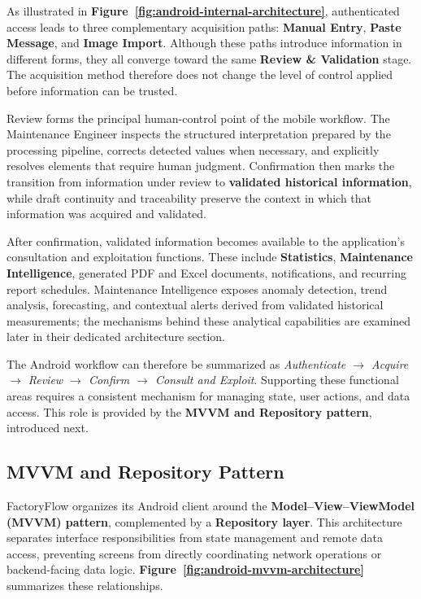 As illustrated in \textbf{Figure~\ref{fig:android-internal-architecture}}, authenticated access leads to three complementary acquisition paths: \textbf{Manual Entry}, \textbf{Paste Message}, and \textbf{Image Import}. Although these paths introduce information in different forms, they all converge toward the same \textbf{Review \& Validation} stage. The acquisition method therefore does not change the level of control applied before information can be trusted.

Review forms the principal human-control point of the mobile workflow. The Maintenance Engineer inspects the structured interpretation prepared by the processing pipeline, corrects detected values when necessary, and explicitly resolves elements that require human judgment. Confirmation then marks the transition from information under review to \textbf{validated historical information}, while draft continuity and traceability preserve the context in which that information was acquired and validated.

After confirmation, validated information becomes available to the application's consultation and exploitation functions. These include \textbf{Statistics}, \textbf{Maintenance Intelligence}, generated PDF and Excel documents, notifications, and recurring report schedules. Maintenance Intelligence exposes anomaly detection, trend analysis, forecasting, and contextual alerts derived from validated historical measurements; the mechanisms behind these analytical capabilities are examined later in their dedicated architecture section.

The Android workflow can therefore be summarized as \textit{Authenticate $\rightarrow$ Acquire $\rightarrow$ Review $\rightarrow$ Confirm $\rightarrow$ Consult and Exploit}. Supporting these functional areas requires a consistent mechanism for managing state, user actions, and data access. This role is provided by the \textbf{MVVM and Repository pattern}, introduced next.

\subsection{MVVM and Repository Pattern}
\label{subsec:android-mvvm-repository}

FactoryFlow organizes its Android client around the \textbf{Model--View--ViewModel (MVVM) pattern}, complemented by a \textbf{Repository layer}. This architecture separates interface responsibilities from state management and remote data access, preventing screens from directly coordinating network operations or backend-facing data logic. \textbf{Figure~\ref{fig:android-mvvm-architecture}} summarizes these relationships.

